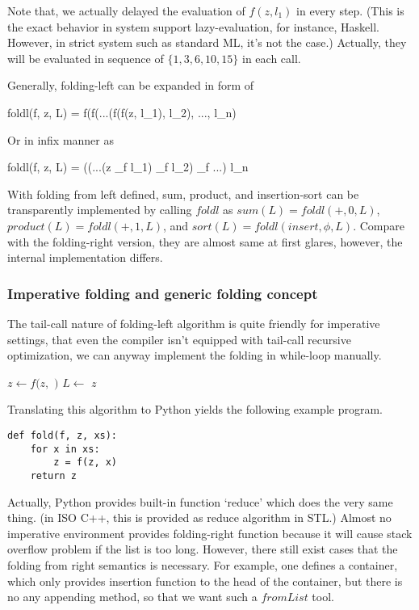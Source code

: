 \documentclass[UTF8]{article}
\begin{document}
Note that, we actually delayed the evaluation of $f(z, l_1)$ in every step. (This is the exact behavior
in system support lazy-evaluation, for instance, Haskell. However, in strict system such as standard ML, it's not the case.) Actually, they will be evaluated in sequence
of $\{ 1, 3, 6, 10, 15\}$ in each call.

Generally, folding-left can be expanded in form of

\be
foldl(f, z, L) = f(f(...(f(f(z, l_1), l_2), ..., l_n)
\ee

Or in infix manner as

\be
foldl(f, z, L) = ((...(z \oplus_f l_1) \oplus_f l_2) \oplus_f ...) \oplus l_n
\ee

With folding from left defined, sum, product, and insertion-sort can be transparently implemented by calling
$foldl$ as $sum(L) = foldl(+, 0, L)$, $product(L) = foldl(+, 1, L)$, and $sort(L) = foldl(insert, \phi, L)$.
Compare with the folding-right version, they are almost same at first glares, however, the internal implementation
differs.

\subsubsection{Imperative folding and generic folding concept}
The tail-call nature of folding-left algorithm is quite friendly for imperative settings, that even the compiler
isn't equipped with tail-call recursive optimization, we can anyway implement the folding in while-loop manually.

\begin{algorithmic}[1]
    \State $z \gets f(z, $  $)$
    \State $L \gets$ 
  \EndWhile
  \State \Return $z$
\EndFunction
\end{algorithmic}

Translating this algorithm to Python yields the following example program.

\lstset{language=Python}
\begin{lstlisting}
def fold(f, z, xs):
    for x in xs:
        z = f(z, x)
    return z
\end{lstlisting}

Actually, Python provides built-in function `reduce' which does the very same thing. (in ISO C++, this is
provided as reduce algorithm in STL.) Almost no imperative environment provides folding-right function because
it will cause stack overflow problem if the list is too long. However, there still exist cases that the folding from right
semantics is necessary. For example, one defines a container, which only provides insertion function to
the head of the container, but there is no any appending method, so that we want such a $fromList$
tool.
\end{document}

